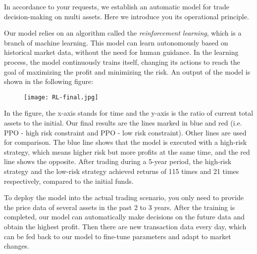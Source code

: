 \documentclass{mcmthesis}
\begin{document}
\begin{center}
\end{center}

\newpage
\memodate{\today}
\begin{memo}[Memorandum]


In accordance to your requests, we establish an automatic model for trade decision-making on multi assets.
Here we introduce you its operational principle.

Our model relies on an algorithm called the \textit{reinforcement learning}, which is a branch of machine learning.
This model can learn autonomously based on historical market data, without the need for human guidance.
In the learning process, the model continuously trains itself, changing its actions to reach the goal of maximizing the profit and minimizing the risk.
An output of the model is shown in the following figure:

\begin{figure}[h]
  \small
  \centering
  \texttt{[image: RL-final.jpg]}
\end{figure}

In the figure, the x-axis stands for time and the y-axis is the ratio of current total assets to the initial.
Our final results are the lines marked in blue and red (i.e. PPO - high risk constraint and PPO - low risk constraint).
Other lines are used for comparison.
The blue line shows that the model is executed with a high-risk strategy, which means higher risk but more profits at the same time, and the red line shows the opposite.
After trading during a 5-year period, the high-risk strategy and the low-risk strategy achieved returns of 115 times and 21 times respectively, compared to the initial funds.


To deploy the model into the actual trading scenario, you only need to provide the price data of several assets in the past 2 to 3 years. After the training is completed, our model can automatically make decisions on the future data and obtain the highest profit. Then there are new transaction data every day, which can be fed back to our model to fine-tune parameters and adapt to market changes.


\end{memo}
\end{document}
